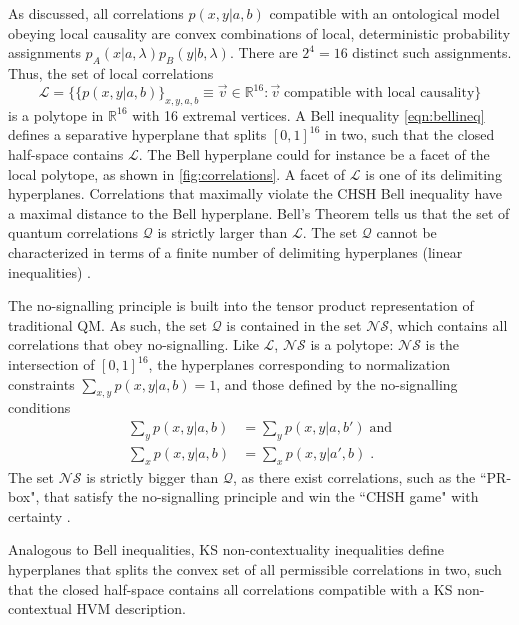 As discussed, all correlations $p(x,y\vert a,b)$ compatible with an ontological model obeying local causality are convex combinations of local, deterministic probability assignments $p_A(x \vert a,\lambda)p_B(y \vert b,\lambda)$. There are $2^4=16$ distinct such assignments. Thus, the set of local correlations 
\begin{equation*}
\mathcal{L} =\{\{p(x,y\vert a,b)\}_{x,y,a,b}\equiv \vec{v}\in\mathbb{R}^{16}: \vec{v}\; \text{compatible with local causality}\}
\end{equation*}
is a polytope in $\mathbb{R}^{16}$ with 16 extremal vertices. A Bell inequality \ref{eqn:bellineq} defines a separative hyperplane that splits $[0,1]^{16}$ in two, such that the closed half-space contains $\mathcal{L}$. The Bell hyperplane could for instance be a facet of the local polytope, as shown in \ref{fig:correlations}. A facet of $\mathcal{L}$ is one of its delimiting hyperplanes. Correlations that maximally violate the CHSH Bell inequality have a maximal distance to the Bell hyperplane. Bell's Theorem tells us that the set of quantum correlations $\mathcal{Q}$ is strictly larger than $\mathcal{L}$. The set $\mathcal{Q}$ cannot be characterized in terms of a finite number of delimiting hyperplanes (linear inequalities) \cite{Brunner2014}. 

The no-signalling principle is built into the tensor product representation of traditional QM. As such, the set $\mathcal{Q}$ is contained in the set $\mathcal{NS}$, which contains all correlations that obey no-signalling. Like $\mathcal{L}$, $\mathcal{NS}$ is a polytope: $\mathcal{NS}$ is the intersection of $[0,1]^{16}$, the hyperplanes corresponding to normalization constraints $\sum_{x,y} p(x,y\vert a,b)=1$, and those defined by the no-signalling conditions
\begin{align*}
\sum_y p(x,y\vert a,b) & = \sum_y p(x,y\vert a,b') \; \text{and} \\
\sum_x p(x,y\vert a,b) & = \sum_x p(x,y\vert a',b)\;.
\end{align*}
The set $\mathcal{NS}$ is strictly bigger than $\mathcal{Q}$, as there exist correlations, such as the ``PR-box", that satisfy the no-signalling principle and win the ``CHSH game" with certainty \cite{Brunner2014}.

Analogous to Bell inequalities, KS non-contextuality inequalities define hyperplanes that splits the convex set of all permissible correlations in two, such that the closed half-space contains all correlations compatible with a KS non-contextual HVM description.

